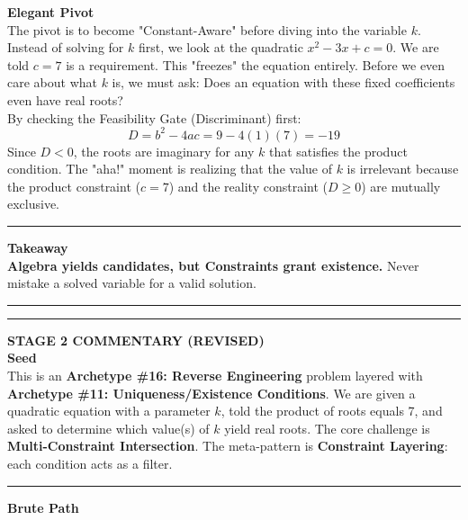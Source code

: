\documentclass{article}
\begin{document}
\noindent \textbf{Elegant Pivot} \\

\noindent The pivot is to become "Constant-Aware" before diving into the variable $k$. Instead of solving for $k$ first, we look at the quadratic $x^2 - 3x + c = 0$. We are told $c=7$ is a requirement. This "freezes" the equation entirely. Before we even care about what $k$ is, we must ask: Does an equation with these fixed coefficients even have real roots? \\

\noindent By checking the Feasibility Gate (Discriminant) first:
\begin{equation*}
D = b^2 - 4ac = 9 - 4(1)(7) = -19
\end{equation*}
\noindent Since $D < 0$, the roots are imaginary for any $k$ that satisfies the product condition. The "aha!" moment is realizing that the value of $k$ is irrelevant because the product constraint ($c=7$) and the reality constraint ($D \ge 0$) are mutually exclusive. \\

\noindent \rule{\textwidth}{0.4pt}

\noindent \textbf{Takeaway} \\

\noindent \textbf{Algebra yields candidates, but Constraints grant existence.} Never mistake a solved variable for a valid solution. \\

\noindent \rule{\textwidth}{0.4pt}
\noindent \rule{\textwidth}{0.4pt}

\noindent \textbf{STAGE 2 COMMENTARY (REVISED)} \\

\noindent \textbf{Seed} \\

\noindent This is an \textbf{Archetype \#16: Reverse Engineering} problem layered with \textbf{Archetype \#11: Uniqueness/Existence Conditions}. We are given a quadratic equation with a parameter $k$, told the product of roots equals 7, and asked to determine which value(s) of $k$ yield real roots. The core challenge is \textbf{Multi-Constraint Intersection}. The meta-pattern is \textbf{Constraint Layering}: each condition acts as a filter. \\

\noindent \rule{\textwidth}{0.4pt}

\noindent \textbf{Brute Path} \\
\end{document}
